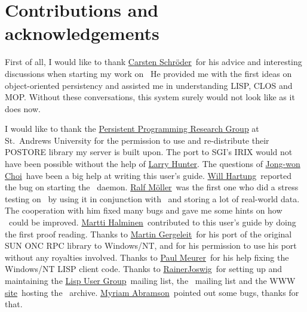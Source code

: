 \chapter{Contributions and acknowledgements}

First of all, I would like to thank
\href{mailto:schroeder@acm.org}{Carsten Schr\"{o}der}\ for his advice and interesting discussions when starting my work on
\plob\ He provided me with the first ideas on object-oriented
persistency and assisted me in understanding LISP, CLOS and MOP.
Without these conversations, this system surely would not look like as
it does now.

I would like to thank the
\href{http://www-ppg.dcs.st-andrew.ac.uk/Default.html}{Persistent
  Programming Research Group} at St.\ Andrews University for the
permission to use and re-distribute their POSTORE library my server is
built upon.  The port to SGI's IRIX would not have been possible
without the help of \href{mailto:hunter@work.nlm.nih.gov}{Larry
  Hunter}.  The questions of
\href{mailto:jwchoi@lgsemicon.co.kr}{Jong-won Choi}\ have been a big
help at writing this user's guide.
\href{mailto:vfr750@netcom.com}{Will Hartung}\ reported the bug on
starting the \ daemon.
\href{mailto:moeller@informatik.uni-hamburg.de}{Ralf M\"{o}ller}\ was
the first one who did a stress testing on \plob\ by using it in
conjunction with \ and storing a lot of real-world data.
The cooperation with him fixed many bugs and gave me some hints on how
\plob\ could be improved.  \href{mailto:mha@dpe.fi}{Martti Halminen}\ 
contributed to this user's guide by doing the first proof reading.
Thanks to \href{mailto:gergeleit@gmd.de}{Martin Gergeleit}\ for his
port of the original SUN ONC RPC library to Windows/NT, and for his
permission to use his port without any royalties involved. Thanks to
\href{mailto:paul.meurer@hit.uib.no}{Paul Meurer}\ for his help fixing
the Windows/NT LISP client code.  Thanks to
\href{mailto:joswig@lavielle.com}{RainerJoswig}\ for setting up and
maintaining the \href{mailto:lug-request@lisp.de}{Lisp User Group}\ 
mailing list, the \href{mailto:plob-request@lisp.de}{\plob}\ mailing
list and the WWW \href{http://www.lisp.de}{site}\ hosting the \plob\ 
archive. \href{mabramso@nlm.nih.gov}{Myriam Abramson}\ pointed out
some bugs, thanks for that.

